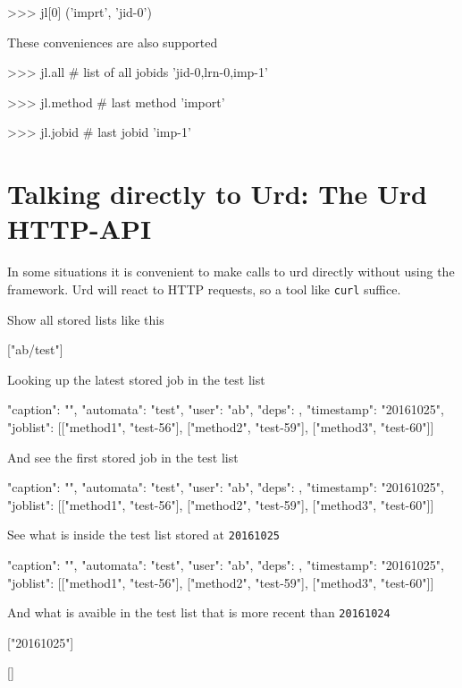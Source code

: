 \begin{pythonMID}
>>> jl[0]
('imprt', 'jid-0')
\end{pythonMID}
These conveniences are also supported

\begin{pythonEND}
>>> jl.all              # list of all jobids
'jid-0,lrn-0,imp-1'

>>> jl.method           # last method
'import'

>>> jl.jobid            # last jobid
'imp-1'
\end{pythonEND}



\newpage
\section{Talking directly to Urd:  The Urd HTTP-API}

In some situations it is convenient to make calls to urd directly
without using the framework.  Urd will react to HTTP requests, so a
tool like \texttt{curl} suffice.

\noindent Show all stored lists like this
\begin{shell}
["ab/test"]
\end{shell}

Looking up the latest stored job in the test list
\begin{shell}
{"caption": "", "automata": "test", "user": "ab", "deps": {},
  "timestamp": "20161025", "joblist": [["method1", "test-56"],
  ["method2", "test-59"], ["method3", "test-60"]]}
\end{shell}
And see the first stored job in the test list
\begin{shell}
{"caption": "", "automata": "test", "user": "ab", "deps": {},
  "timestamp": "20161025", "joblist": [["method1", "test-56"],
  ["method2", "test-59"], ["method3", "test-60"]]}
\end{shell}
See what is inside the test list stored at \texttt{20161025}
\begin{shell}
{"caption": "", "automata": "test", "user": "ab", "deps": {},
  "timestamp": "20161025", "joblist": [["method1", "test-56"],
  ["method2", "test-59"], ["method3", "test-60"]]}
\end{shell}
And what is avaible in the test list that is more recent than \texttt{20161024}
\begin{shell}
["20161025"]
\end{shell}
\begin{shell}
[]
\end{shell}
